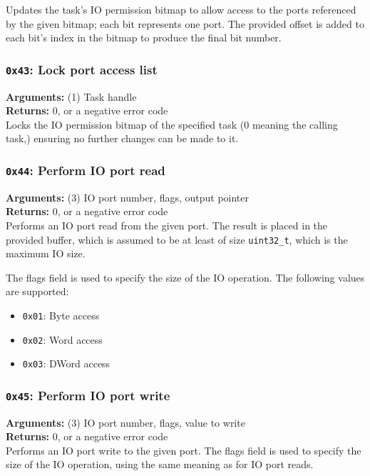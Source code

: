 \documentclass[11pt]{article}
\begin{document}
Updates the task's IO permission bitmap to allow access to the ports referenced by the given bitmap; each bit represents one port. The provided offset is added to each bit's index in the bitmap to produce the final bit number.

\subsubsection{{\tt 0x43}: Lock port access list}
\textbf{Arguments:} (1) Task handle \\
\textbf{Returns:} 0, or a negative error code \\

Locks the IO permission bitmap of the specified task (0 meaning the calling task,) ensuring no further changes can be made to it.

\subsubsection{{\tt 0x44}: Perform IO port read}
\textbf{Arguments:} (3) IO port number, flags, output pointer \\
\textbf{Returns:} 0, or a negative error code \\

Performs an IO port read from the given port. The result is placed in the provided buffer, which is assumed to be at least of size \texttt{uint32\_t}, which is the maximum IO size.

The flags field is used to specify the size of the IO operation. The following values are supported:
\begin{itemize}
\item \texttt{0x01}: Byte access
\item \texttt{0x02}: Word access
\item \texttt{0x03}: DWord access
\end{itemize}

\subsubsection{{\tt 0x45}: Perform IO port write}
\textbf{Arguments:} (3) IO port number, flags, value to write \\
\textbf{Returns:} 0, or a negative error code \\

Performs an IO port write to the given port. The flags field is used to specify the size of the IO operation, using the same meaning as for IO port reads.
\end{document}
